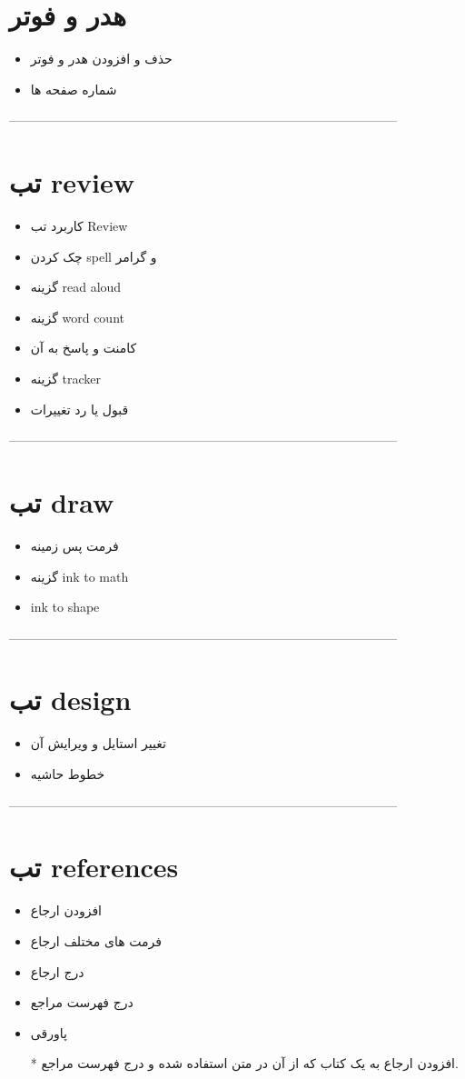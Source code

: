 \section{هدر و فوتر}
\begin{itemize}
\item
حذف و افزودن هدر و فوتر
\item
شماره صفحه ها
\end{itemize}
--------------------------------------------------------------------------------------------
\section{تب review}
\begin{itemize}
\item
کاربرد تب Review
\item
چک کردن spell و گرامر
\item
گزینه read aloud
\item
گزینه word count
\item
کامنت و پاسخ به آن
\item
گزینه tracker
\item
قبول یا رد تغییرات
\end{itemize}
--------------------------------------------------------------------------------------------
\section{تب draw}
\begin{itemize}
\item
فرمت پس زمینه
\item
گزینه ink to math
\item
ink to shape
\end{itemize}
--------------------------------------------------------------------------------------------
\section{تب design}
\begin{itemize}
\item
تغییر استایل و ویرایش آن
\item
خطوط حاشیه
\end{itemize}
--------------------------------------------------------------------------------------------
\section{تب references}
\begin{itemize}
\item
افزودن ارجاع
\item
فرمت های مختلف ارجاع
\item
درج ارجاع
\item
درج فهرست مراجع
\item
پاورقی
\item[*]
افزودن ارجاع به یک کتاب که از آن در متن استفاده شده و درج فهرست مراجع.
\end{itemize}
